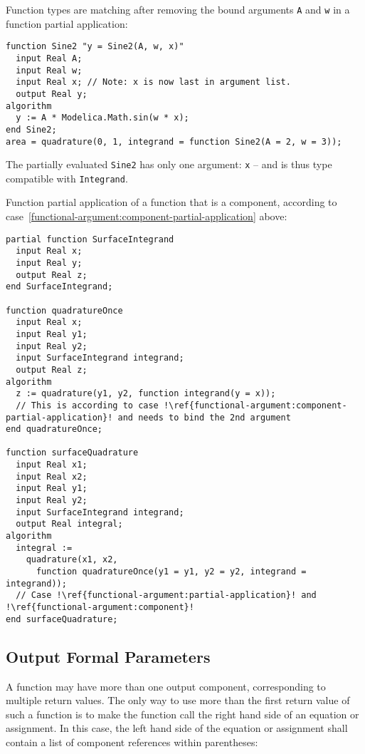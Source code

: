 \begin{example}
Function types are matching after removing the bound arguments \lstinline!A! and \lstinline!w! in a function partial
application:
\begin{lstlisting}[language=modelica]
function Sine2 "y = Sine2(A, w, x)"
  input Real A;
  input Real w;
  input Real x; // Note: x is now last in argument list.
  output Real y;
algorithm
  y := A * Modelica.Math.sin(w * x);
end Sine2;
area = quadrature(0, 1, integrand = function Sine2(A = 2, w = 3));
\end{lstlisting}
The partially evaluated \lstinline!Sine2! has only one argument: \lstinline!x! -- and is thus type compatible with \lstinline!Integrand!.
\end{example}

\begin{example}
Function partial application of a function that is a component, according to case~\ref{functional-argument:component-partial-application} above:
\begin{lstlisting}[language=modelica,escapechar=!]
partial function SurfaceIntegrand
  input Real x;
  input Real y;
  output Real z;
end SurfaceIntegrand;

function quadratureOnce
  input Real x;
  input Real y1;
  input Real y2;
  input SurfaceIntegrand integrand;
  output Real z;
algorithm
  z := quadrature(y1, y2, function integrand(y = x));
  // This is according to case !\ref{functional-argument:component-partial-application}! and needs to bind the 2nd argument
end quadratureOnce;

function surfaceQuadrature
  input Real x1;
  input Real x2;
  input Real y1;
  input Real y2;
  input SurfaceIntegrand integrand;
  output Real integral;
algorithm
  integral :=
    quadrature(x1, x2,
      function quadratureOnce(y1 = y1, y2 = y2, integrand = integrand));
  // Case !\ref{functional-argument:partial-application}! and !\ref{functional-argument:component}!
end surfaceQuadrature;
\end{lstlisting}
\end{example}


\subsection{Output Formal Parameters}\label{output-formal-parameters-of-functions}

A function may have more than one output component, corresponding to
multiple return values. The only way to use more than the first return
value of such a function is to make the function call the right hand
side of an equation or assignment. In this case, the left hand side of
the equation or assignment shall contain a list of component references
within parentheses:

